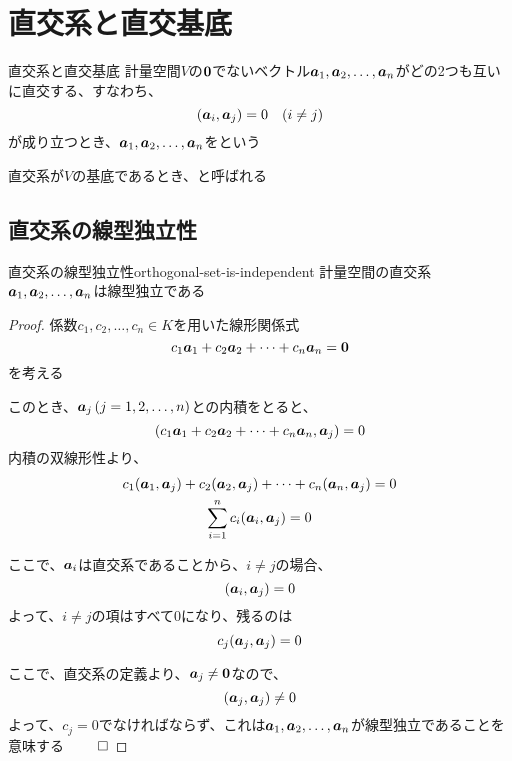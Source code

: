 \documentclass[../../../topic_linear-algebra]{subfiles}
\begin{document}
\sectionline
\section{直交系と直交基底}

\begin{definition}{直交系と直交基底}
  計量空間$V$の$\vb*{0}$でないベクトル$\vb*{a}_1, \vb*{a}_2, \ldots, \vb*{a}_n$がどの2つも互いに直交する、すなわち、
  \begin{equation*}
    (\vb*{a}_i, \vb*{a}_j) = 0 \quad (i \neq j)
  \end{equation*}
  が成り立つとき、$\vb*{a}_1, \vb*{a}_2, \ldots, \vb*{a}_n$をという

  直交系が$V$の基底であるとき、と呼ばれる
\end{definition}

\subsection{直交系の線型独立性}

\begin{theorem}{直交系の線型独立性}{orthogonal-set-is-independent}
  計量空間の直交系$\vb*{a}_1, \vb*{a}_2, \ldots, \vb*{a}_n$は線型独立である
\end{theorem}

\begin{proof}
  係数$c_1, c_2, \ldots, c_n \in K$を用いた線形関係式
  \begin{equation*}
    c_1 \vb*{a}_1 + c_2 \vb*{a}_2 + \cdots + c_n \vb*{a}_n = \vb*{0}
  \end{equation*}
  を考える

  このとき、$\vb*{a}_j \, (j=1,2,\ldots,n)$との内積をとると、
  \begin{equation*}
    (c_1 \vb*{a}_1 + c_2 \vb*{a}_2 + \cdots + c_n \vb*{a}_n, \vb*{a}_j) = 0
  \end{equation*}
  内積の双線形性より、
  \begin{gather*}
    c_1 (\vb*{a}_1, \vb*{a}_j) + c_2 (\vb*{a}_2, \vb*{a}_j) + \cdots + c_n (\vb*{a}_n, \vb*{a}_j) = 0 \\
    \sum_{i=1}^n c_i (\vb*{a}_i, \vb*{a}_j) = 0
  \end{gather*}

  ここで、$\vb*{a}_i$は直交系であることから、$i \neq j$の場合、
  \begin{equation*}
    (\vb*{a}_i, \vb*{a}_j) = 0
  \end{equation*}
  よって、$i \neq j$の項はすべて0になり、残るのは
  \begin{equation*}
    c_j (\vb*{a}_j, \vb*{a}_j) = 0
  \end{equation*}

  ここで、直交系の定義より、$\vb*{a}_j \neq \vb*{0}$なので、
  \begin{equation*}
    (\vb*{a}_j, \vb*{a}_j) \neq 0
  \end{equation*}
  よって、$c_j = 0$でなければならず、これは$\vb*{a}_1, \vb*{a}_2, \ldots, \vb*{a}_n$が線型独立であることを意味する $\qed$
\end{proof}
\end{document}
